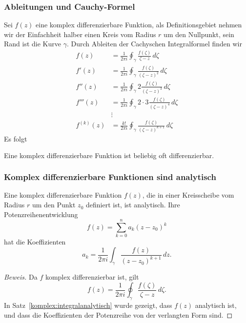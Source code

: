 \subsubsection{Ableitungen und Cauchy-Formel}
Sei $f(z)$ eine komplex differenzierbare Funktion, als Definitionsgebiet
nehmen wir der Einfachheit halber einen Kreis vom Radius $r$ um den Nullpunkt,
sein Rand ist die Kurve $\gamma$.
Durch Ableiten der Cachyschen Integralformel finden wir
\begin{align*}
f(z)
&=
\frac1{2\pi i}\oint_{\gamma}\frac{f(\zeta)}{\zeta-z}\,d\zeta
\\
f'(z)
&=
\frac1{2\pi i}\oint_{\gamma}\frac{f(\zeta)}{(\zeta-z)^2}\,d\zeta
\\
f'' (z)
&=
\frac1{2\pi i}\oint_{\gamma}2\frac{f(\zeta)}{(\zeta-z)^3}\,d\zeta
\\
f'''(z)
&=
\frac1{2\pi i}\oint_{\gamma}2\cdot 3\frac{f(\zeta)}{(\zeta-z)^4}\,d\zeta
\\
&\vdots
\\
f^{(k)}(z)
&=
\frac{k!}{2\pi i}\oint_{\gamma}\frac{f(\zeta)}{(\zeta-z)^{k+1}}\,d\zeta
\end{align*}
Es folgt

\begin{satz}
Eine komplex differenzierbare Funktion ist beliebig oft differenzierbar.
\end{satz}

\subsubsection{Komplex differenzierbare Funktionen sind analytisch}

\begin{satz}
Eine komplex differenzierbare Funktion $f(z)$, die in einer Kreisscheibe
vom Radius $r$ um den Punkt $z_0$ definiert ist, ist analytisch.
Ihre Potenzreihenentwicklung
\[
f(z)=\sum_{k=0}^na_k(z-z_0)^k
\]
hat die Koeffizienten
\[
a_k=\frac1{2\pi i}\int_{\gamma}\frac{f(z)}{(z-z_0)^{k+1}}\,dz.
\]
\end{satz}

\begin{proof}[Beweis]
Da $f$ komplex differenzierbar ist, gilt
\[
f(z)=\frac1{2\pi i}\oint_\gamma \frac{f(\zeta)}{\zeta-z}\,d\zeta.
\]
In Satz~\ref{komplex:integralanalytisch} wurde gezeigt, dass $f(z)$
analytisch ist, und dass die Koeffizienten der Potenzreihe von
der verlangten Form sind.
\end{proof}

%
%
